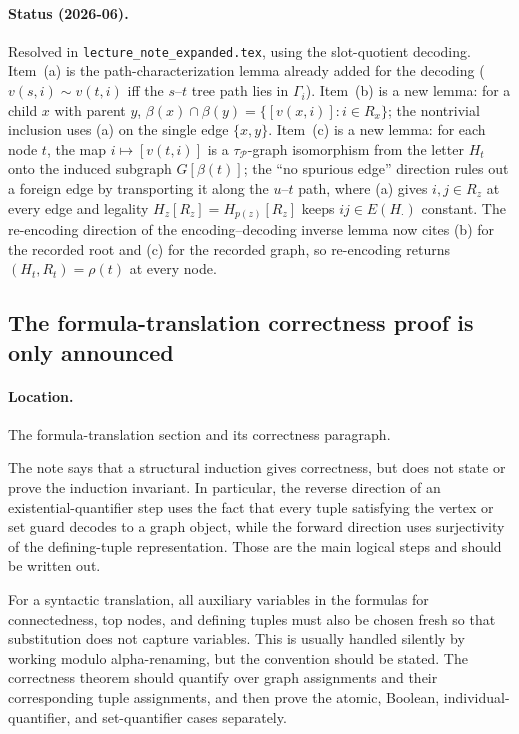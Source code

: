 \documentclass[11pt]{article}
\begin{document}
\paragraph{Status (2026-06).} Resolved in \texttt{lecture\_note\_expanded.tex},
using the slot-quotient decoding.  Item~(a) is the path-characterization lemma
already added for the decoding (\(v(s,i)\sim v(t,i)\) iff the \(s\)--\(t\) tree
path lies in \(\Gamma_i\)).  Item~(b) is a new lemma: for a child \(x\) with
parent \(y\), \(\beta(x)\cap\beta(y)=\{[v(x,i)]:i\in R_x\}\); the nontrivial
inclusion uses (a) on the single edge \(\{x,y\}\).  Item~(c) is a new lemma: for
each node \(t\), the map \(i\mapsto[v(t,i)]\) is a \(\tau_{\mathcal P}\)-graph
isomorphism from the letter \(H_t\) onto the induced subgraph \(G[\beta(t)]\); the
``no spurious edge'' direction rules out a foreign edge by transporting it along
the \(u\)--\(t\) path, where (a) gives \(i,j\in R_z\) at every edge and legality
\(H_z[R_z]=H_{p(z)}[R_z]\) keeps \(ij\in E(H_\cdot)\) constant.  The re-encoding
direction of the encoding--decoding inverse lemma now cites (b) for the recorded
root and (c) for the recorded graph, so re-encoding returns
\((H_t,R_t)=\rho(t)\) at every node.

\subsection{The formula-translation correctness proof is only announced}

\paragraph{Location.} The formula-translation section and its correctness
paragraph.

The note says that a structural induction gives correctness, but does not state
or prove the induction invariant.  In particular, the reverse direction of an
existential-quantifier step uses the fact that every tuple satisfying the
vertex or set guard decodes to a graph object, while the forward direction uses
surjectivity of the defining-tuple representation.  Those are the main logical
steps and should be written out.

For a syntactic translation, all auxiliary variables in the formulas for
connectedness, top nodes, and defining tuples must also be chosen fresh so that
substitution does not capture variables.  This is usually handled silently by
working modulo alpha-renaming, but the convention should be stated.  The
correctness theorem should quantify over graph assignments and their
corresponding tuple assignments, and then prove the atomic, Boolean, individual-
quantifier, and set-quantifier cases separately.
\end{document}
